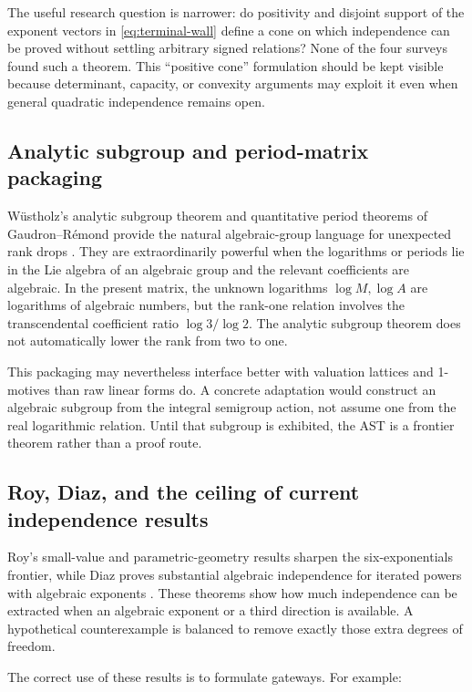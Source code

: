 \documentclass[10pt,letterpaper]{article}
\begin{document}
The useful research question is narrower: do positivity and disjoint support of the exponent
vectors in \cref{eq:terminal-wall} define a cone on which independence can be proved without
settling arbitrary signed relations?  None of the four surveys found such a theorem.  This
``positive cone'' formulation should be kept visible because determinant, capacity, or
convexity arguments may exploit it even when general quadratic independence remains open.

\subsection{Analytic subgroup and period-matrix packaging}

W\"ustholz's analytic subgroup theorem and quantitative period theorems of
Gaudron--R\'emond provide the natural algebraic-group language for unexpected rank drops
\cite{Wustholz1989,GaudronRemond}.  They are extraordinarily powerful when the logarithms or
periods lie in the Lie algebra of an algebraic group and the relevant coefficients are
algebraic.  In the present matrix, the unknown logarithms \(\log M,\log A\) are logarithms of
algebraic numbers, but the rank-one relation involves the transcendental coefficient ratio
\(\log3/\log2\).  The analytic subgroup theorem does not automatically lower the rank from
two to one.

This packaging may nevertheless interface better with valuation lattices and 1-motives than
raw linear forms do.  A concrete adaptation would construct an algebraic subgroup from the
integral semigroup action, not assume one from the real logarithmic relation.  Until that
subgroup is exhibited, the AST is a frontier theorem rather than a proof route.

\subsection{Roy, Diaz, and the ceiling of current independence results}

Roy's small-value and parametric-geometry results sharpen the six-exponentials frontier, while
Diaz proves substantial algebraic independence for iterated powers with algebraic exponents
\cite{RoySixExp,Diaz1989}.  These theorems show how much independence can be extracted when
an algebraic exponent or a third direction is available.  A hypothetical counterexample is
balanced to remove exactly those extra degrees of freedom.

The correct use of these results is to formulate gateways.  For example:
\end{document}
